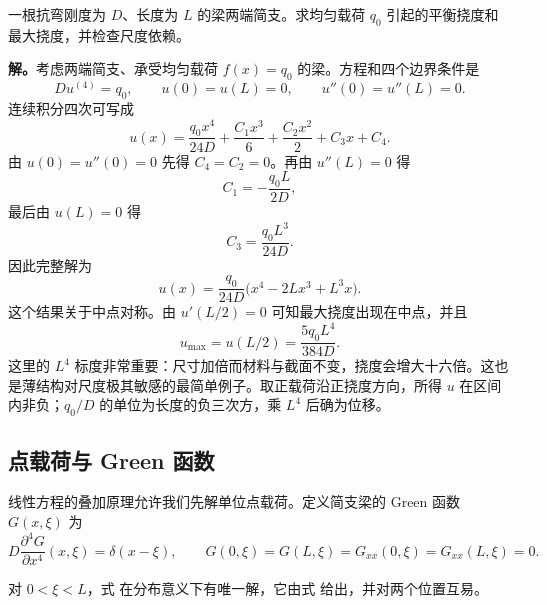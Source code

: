 \begin{exbox}[均布载荷下的简支梁]
一根抗弯刚度为 $D$、长度为 $L$ 的梁两端简支。求均匀载荷 $q_0$ 引起的平衡挠度和最大挠度，并检查尺度依赖。

\textbf{解。}考虑两端简支、承受均匀载荷 \(f(x)=q_0\) 的梁。方程和四个边界条件是
\[
 Du^{(4)}=q_0,
 \qquad
 u(0)=u(L)=0,
 \qquad
 u''(0)=u''(L)=0.
\]
连续积分四次可写成
\[
 u(x)=\frac{q_0x^4}{24D}
 +\frac{C_1x^3}{6}+\frac{C_2x^2}{2}+C_3x+C_4.
\]
由 \(u(0)=u''(0)=0\) 先得 \(C_4=C_2=0\)。再由 \(u''(L)=0\) 得
\[
 C_1=-\frac{q_0L}{2D},
\]
最后由 \(u(L)=0\) 得
\[
 C_3=\frac{q_0L^3}{24D}.
\]
因此完整解为
\begin{equation}
 u(x)=\frac{q_0}{24D}
 \bigl(x^4-2Lx^3+L^3x\bigr).
 \label{eq:phys-cont-uniform-simply-supported-beam}
\end{equation}
这个结果关于中点对称。由 \(u'(L/2)=0\) 可知最大挠度出现在中点，并且
\[
 u_{\max}=u(L/2)=\frac{5q_0L^4}{384D}.
\]
这里的 \(L^4\) 标度非常重要：尺寸加倍而材料与截面不变，挠度会增大十六倍。这也是薄结构对尺度极其敏感的最简单例子。取正载荷沿正挠度方向，所得 $u$ 在区间内非负；$q_0/D$ 的单位为长度的负三次方，乘 $L^4$ 后确为位移。
\end{exbox}

\subsection{点载荷与 Green 函数}

线性方程的叠加原理允许我们先解单位点载荷。定义简支梁的 Green 函数 \(G(x,\xi)\) 为
\begin{equation}
 D\frac{\partial^4G}{\partial x^4}(x,\xi)=\delta(x-\xi),
 \qquad
 G(0,\xi)=G(L,\xi)=G_{xx}(0,\xi)=G_{xx}(L,\xi)=0.
 \label{eq:phys-cont-beam-green-definition}
\end{equation}
\begin{proposition}[简支梁的单位点力响应]
对 $0<\xi<L$，式 在分布意义下有唯一解，它由式 给出，并对两个位置互易。
\end{proposition}

